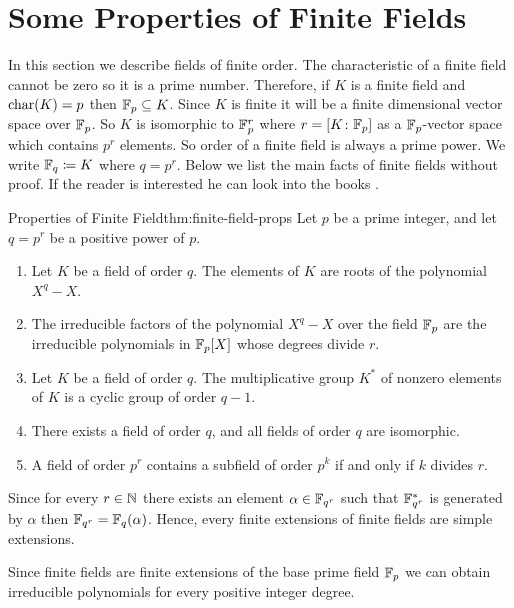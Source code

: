 \section{Some Properties of Finite Fields}
In this section we describe fields of finite order. 
The characteristic of a finite field cannot be zero so it is a prime number. 
Therefore, if $K$ is a finite field and $\operatorname{char}(K)=p$ then $\mathbb{F}_p\subseteq K$. 
Since $K$ is finite it will be a finite dimensional vector space over $\mathbb{F}_p$. 
So $K$ is isomorphic to $\mathbb{F}_p^r$ where $r=[K\colon \mathbb{F}_p]$ as a $\mathbb{F}_p$-vector space which contains $p^r$ elements. 
So order of a finite field is always a prime power. 
We write $\mathbb{F}_q\coloneqq K$ where $q=p^r$.
Below we list the main facts of finite fields without proof. 
If the reader is interested he can look into the books \cite{Artin2011,Lidl1996}.

\begin{Theorem}{Properties of Finite Field}{thm:finite-field-props}
  Let $p$ be a prime integer, and let $q=p^r$ be a positive power of $p$.
  \begin{enumerate}[label=(\roman*)]
    \item Let $K$ be a field of order $q$. The elements of $K$ are roots of the polynomial $X^q-X$.
    \item The irreducible factors of the polynomial $X^{q}-X$ over the field $\mathbb{F}_p$ are the irreducible polynomials in $\mathbb{F}_p[X]$ whose degrees divide $r$.
    \item Let $K$ be a field of order $q$. The multiplicative group $K^*$ of nonzero elements of $K$ is a cyclic group of order $q-1$.
    \item There exists a field of order $q$, and all fields of order $q$ are isomorphic.
    \item A field of order $p^r$ contains a subfield of order $p^k$ if and only if $k$ divides $r$.
  \end{enumerate}
\end{Theorem}

\begin{observation}\label{obs:finite-ext-simple}
  Since for every $r\in\mathbb{N}$ there exists an element $\alpha\in \mathbb{F}_{q^r}$ such that $\mathbb{F}_{q^r}^*$ is generated by $\alpha$ then $\mathbb{F}_{q^r}=\mathbb{F}_q(\alpha)$. Hence, every finite extensions of finite fields are simple extensions. 
\end{observation}

Since finite fields are finite extensions of the base prime field $\mathbb{F}_p$ we can obtain irreducible polynomials for every positive integer degree. 

